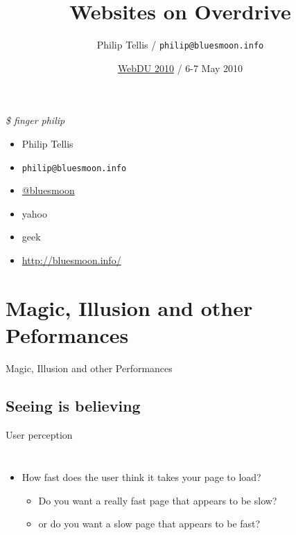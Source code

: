 \documentclass{beamer}
\author{Philip Tellis / \texttt{philip@bluesmoon.info}}
\title{Websites on Overdrive}
\date{\href{http://www.webdu.com.au/}{WebDU 2010} / 6-7 May 2010}
\begin{document}
\begin{frame}
  \titlepage
\end{frame}


\begin{frame}{\textit{\$ finger philip}}
  \begin{itemize}
  \item Philip Tellis
  \item \small{\texttt{philip@bluesmoon.info}}
  \item \href{http://twitter.com/bluesmoon}{@bluesmoon}
  \item yahoo
  \item geek
  \item \href{http://bluesmoon.info/}{http://bluesmoon.info/}
  \end{itemize}
\end{frame}


\section{Magic, Illusion and other Peformances}
\begin{frame}{}
  \begin{block}{}
  \begin{center}
  Magic, Illusion and other Performances
  \end{center}
  \end{block}
\end{frame}

\subsection{Seeing is believing}

\begin{frame}{User perception}
  \begin{columns}[t]
  \begin{itemize}
  \item How fast does the user think it takes your page to load?
    \begin{itemize}
    \item<2-> Do you want a really fast page that appears to be slow?
    \item<3-> or do you want a slow page that appears to be fast?
    \end{itemize}
  \end{itemize}
  \end{columns}
\end{frame}
\end{document}
